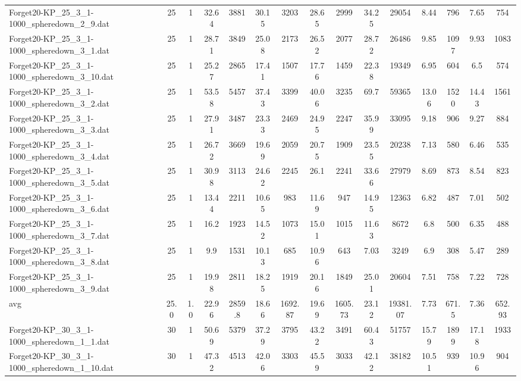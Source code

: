 \begin{table}[!ht]
{\begin{tabular}{lcccccccccccccc}
Forget20-KP\_25\_3\_1-1000\_spheredown\_2\_9.dat & 25 & 1 & 32.64 & 3881 & 30.15 & 3203 & 28.65 & 2999 & 34.25 & 29054 & 8.44 & 796 & 7.65 & 754 \\
Forget20-KP\_25\_3\_1-1000\_spheredown\_3\_1.dat & 25 & 1 & 28.71 & 3849 & 25.08 & 2173 & 26.52 & 2077 & 28.72 & 26486 & 9.85 & 1097 & 9.93 & 1083 \\
Forget20-KP\_25\_3\_1-1000\_spheredown\_3\_10.dat & 25 & 1 & 25.27 & 2865 & 17.41 & 1507 & 17.76 & 1459 & 22.38 & 19349 & 6.95 & 604 & 6.5 & 574 \\
Forget20-KP\_25\_3\_1-1000\_spheredown\_3\_2.dat & 25 & 1 & 53.58 & 5457 & 37.43 & 3399 & 40.06 & 3235 & 69.7 & 59365 & 13.06 & 1520 & 14.43 & 1561 \\
Forget20-KP\_25\_3\_1-1000\_spheredown\_3\_3.dat & 25 & 1 & 27.91 & 3487 & 23.33 & 2469 & 24.95 & 2247 & 35.99 & 33095 & 9.18 & 906 & 9.27 & 884 \\
Forget20-KP\_25\_3\_1-1000\_spheredown\_3\_4.dat & 25 & 1 & 26.72 & 3669 & 19.69 & 2059 & 20.75 & 1909 & 23.55 & 20238 & 7.13 & 580 & 6.46 & 535 \\
Forget20-KP\_25\_3\_1-1000\_spheredown\_3\_5.dat & 25 & 1 & 30.98 & 3113 & 24.62 & 2245 & 26.1 & 2241 & 33.66 & 27979 & 8.69 & 873 & 8.54 & 823 \\
Forget20-KP\_25\_3\_1-1000\_spheredown\_3\_6.dat & 25 & 1 & 13.44 & 2211 & 10.65 & 983 & 11.69 & 947 & 14.95 & 12363 & 6.82 & 487 & 7.01 & 502 \\
Forget20-KP\_25\_3\_1-1000\_spheredown\_3\_7.dat & 25 & 1 & 16.2 & 1923 & 14.52 & 1073 & 15.01 & 1015 & 11.63 & 8672 & 6.8 & 500 & 6.35 & 488 \\
Forget20-KP\_25\_3\_1-1000\_spheredown\_3\_8.dat & 25 & 1 & 9.9 & 1531 & 10.13 & 685 & 10.96 & 643 & 7.03 & 3249 & 6.9 & 308 & 5.47 & 289 \\
Forget20-KP\_25\_3\_1-1000\_spheredown\_3\_9.dat & 25 & 1 & 19.98 & 2811 & 18.25 & 1919 & 20.16 & 1849 & 25.01 & 20604 & 7.51 & 758 & 7.22 & 728 \\
\hline avg & 25.0 & 1.0 & 22.96& 2859.8 & 18.66& 1692.87 & 19.69& 1605.73 & 23.12& 19381.07 & 7.73& 671.5 & 7.36& 652.93\\ \hline
Forget20-KP\_30\_3\_1-1000\_spheredown\_1\_1.dat & 30 & 1 & 50.69 & 5379 & 37.29 & 3795 & 43.22 & 3491 & 60.43 & 51757 & 15.79 & 1899 & 17.18 & 1933 \\
Forget20-KP\_30\_3\_1-1000\_spheredown\_1\_10.dat & 30 & 1 & 47.32 & 4513 & 42.06 & 3303 & 45.59 & 3033 & 42.12 & 38182 & 10.51 & 939 & 10.96 & 904 \\

\end{tabular}}
\end{table}
